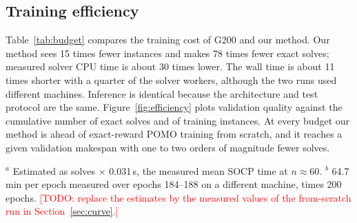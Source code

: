\documentclass[preprint,review,12pt,authoryear]{elsarticle}
\newcommand{\todo}[1]{\textcolor{red}{[TODO: #1]}}
\begin{document}
\subsection{Training efficiency}\label{sec:efficiency}
Table~\ref{tab:budget} compares the training cost of G200 and our method. Our method sees 15 times fewer
instances and makes 78 times fewer exact solves; measured solver CPU time is about 30 times lower. The wall
time is about 11 times shorter with a quarter of the solver workers, although the two runs used different
machines. Inference is identical because the architecture and test protocol are the same.
Figure~\ref{fig:efficiency} plots validation quality against the cumulative number of exact solves and of
training instances. At every budget our method is ahead of exact-reward POMO training from scratch, and it
reaches a given validation makespan with one to two orders of magnitude fewer solves.

\begin{table}[t]\centering\small
\caption{Training budget: POMO with exact rewards (G200) versus the proposed method (E133).}
\label{tab:budget}
\par\smallskip\raggedright\footnotesize
$^{a}$ Estimated as solves $\times$ 0.031\,s, the measured mean SOCP time at $n\approx60$.
$^{b}$ 64.7\,min per epoch measured over epochs 184--188 on a different machine, times 200 epochs.
\todo{replace the estimates by the measured values of the from-scratch run in Section~\ref{sec:curve}.}
\end{table}
\end{document}
